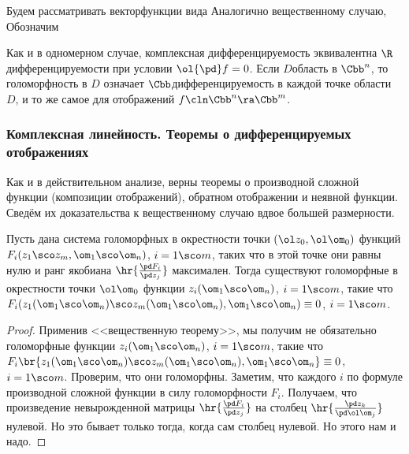 \documentclass[a4paper]{article}
\begin{document}
Будем рассматривать вектор\д функции вида
Аналогично вещественному случаю,
Обозначим

Как и в одномерном случае, комплексная дифференцируемость эквивалентна $\R$\д дифференцируемости при условии $\ol{\pd}f=0$.
Если $D$\т область в $\Cbb^n$, то голоморфность в $D$ означает $\Cbb$\д дифференцируемость в каждой точке области~$D$,
и то же самое для отображений $f\cln \Cbb^n \ra \Cbb^m$.

\subsubsection{Комплексная линейность. Теоремы о дифференцируемых отображениях}

Как и в действительном анализе, верны теоремы о производной сложной функции (композиции отображений),
обратном отображении и неявной функции. Сведём их доказательства к вещественному случаю вдвое большей размерности.

\begin{theorem}
Пусть дана система голоморфных в окрестности точки $(\ol z_0, \ol \om_0)$
функций $F_i(z_1\sco z_m, \om_1\sco \om_n)$, $i = 1\sco m$,
таких что в этой точке они равны нулю и ранг якобиана $\hr{\frac{\pd F_i}{\pd z_j}}$
максимален. Тогда существуют голоморфные в окрестности точки $\ol \om_0$ функции
$z_i(\om_1\sco \om_n)$, $i = 1\sco m$, такие что
$F_i(z_1(\om_1\sco \om_n)\sco z_m(\om_1\sco \om_n), \om_1\sco \om_n)\equiv0$, $i = 1\sco m$.
\end{theorem}
\begin{proof}
Применив <<вещественную теорему>>, мы получим не обязательно голоморфные функции
$z_i(\om_1\sco \om_n)$, $i = 1\sco m$, такие что
$F_i\br{z_1(\om_1\sco \om_n)\sco z_m(\om_1\sco \om_n), \om_1\sco \om_n}\equiv0$, $i = 1\sco m$.
Проверим, что они голоморфны. Заметим, что каждого $i$ по формуле производной сложной функции
в силу голоморфности $F_i$. Получаем, что произведение невырожденной матрицы $\hr{\frac{\pd F_i}{\pd z_j}}$
на столбец $\hr{\frac{\pd z_k}{\pd \ol \om_j}}$ нулевой. Но это бывает только тогда, когда сам столбец
нулевой. Но этого нам и надо.
\end{proof}
\end{document}
